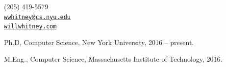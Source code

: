 \documentclass[11pt,article,oneside]{memoir}
\makeatletter
\def\myemail{wwhitney@cs.nyu.edu}
\def\myweb{willwhitney.com}
\def\myphone{(205) 419-5579}
\def\mytwitter{@wfwhitney}
\makeatother
\begin{document}
\begin{minipage}[t]{2.95in}

\end{minipage}
\hfill
\hfill
\begin{minipage}[t]{1.6in}
  \flushright \footnotesize  \addressblock \myphone \, \faPhone \\
  {\scriptsize  \texttt{\href{mailto:\myemail}{\myemail}} \, \faEnvelope} \\
  {\scriptsize  \texttt{\href{https://\myweb}{\myweb}} \, \faGlobe}
\end{minipage}

\medskip

\reversemarginpar

\bigskip


%
%
%
%
%

\bigskip




\ind Ph.D, Computer Science, New York University, 2016 -- present.

\ind M.Eng., Computer Science, Massachusetts Institute of Technology, 2016.
\end{document}
